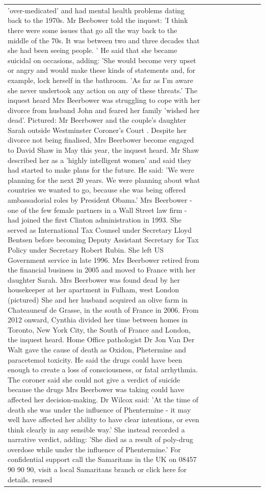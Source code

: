 \begin{table}[H]
\begin{tabular}{lllrlllll}
'over-medicated' and had mental health problems dating back to the 1970s. Mr Beebower told the inquest: 'I think there were some issues that go all the way back to the middle of the 70s. It was between two and three decades that she had been seeing people. ' He said that she became suicidal on occasions, adding: 'She would become very upset or angry and would make these kinds of statements and, for example, lock herself in the bathroom. 'As far as I'm aware she never undertook any action on any of these threats.' The inquest heard Mrs Beerbower was struggling to cope with her divorce from husband John and feared her family 'wished her dead'. Pictured: Mr Beerbower and the couple's daughter Sarah outside Westminster Coroner's Court . Despite her divorce not being finalised, Mrs Beerbower become engaged to David Shaw in May this year, the inquest heard. Mr Shaw described her as a 'highly intelligent women' and said they had started to make plans for the future. He said: 'We were planning for the next 20 years. We were planning about what countries we wanted to go, because she was being offered ambassadorial roles by President Obama.' Mrs Beerbower - one of the few female partners in a Wall Street law firm - had joined the first Clinton administration in 1993. She served as International Tax Counsel under Secretary Lloyd Bentsen before becoming Deputy Assistant Secretary for Tax Policy under Secretary Robert Rubin. She left US Government service in late 1996. Mrs Beerbower retired from the financial business in 2005 and moved to France with her daughter Sarah. Mrs Beerbower was found dead by her housekeeper at her apartment in Fulham, west London (pictured) She and her husband acquired an olive farm in Chateauneuf de Grasse, in the south of France in 2006. From 2012 onward, Cynthia divided her time between homes in Toronto, New York City, the South of France and London, the inquest heard. Home Office pathologist Dr Jon Van Der Walt gave the cause of death as Oxidon, Phetermine and paracetemol toxicity. He said the drugs could have been enough to create a loss of consciousness, or fatal arrhythmia. The coroner said she could not give a verdict of suicide because the drugs Mrs Beerbower was taking could have affected her decision-making. Dr Wilcox said: 'At the time of death she was under the influence of Phentermine - it may well have affected her ability to have clear intentions, or even think clearly in any sensible way.' She instead recorded a narrative verdict, adding: 'She died as a result of poly-drug overdose while under the influence of Phentermine.' For confidential support call the Samaritans in the UK on 08457 90 90 90, visit a local Samaritans branch or click here for details. reused \\

\end{tabular}
\end{table}
